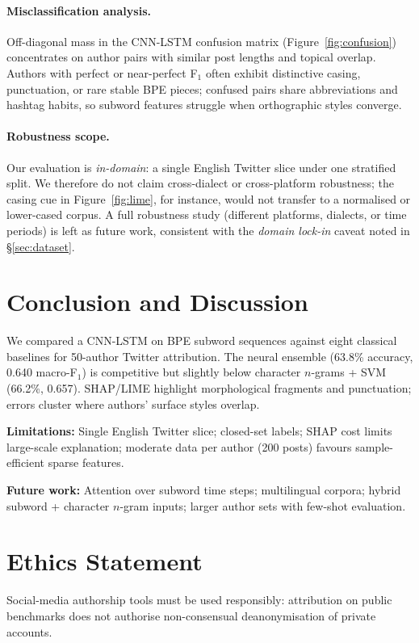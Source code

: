 \documentclass[11pt]{article}
\begin{document}
\paragraph{Misclassification analysis.}
Off-diagonal mass in the CNN-LSTM confusion matrix (Figure~\ref{fig:confusion}) concentrates on author pairs with similar post lengths and topical overlap.
Authors with perfect or near-perfect F$_1$ often exhibit distinctive casing, punctuation, or rare stable BPE pieces; confused pairs share abbreviations and hashtag habits, so subword features struggle when orthographic styles converge.

\paragraph{Robustness scope.}
Our evaluation is \emph{in-domain}: a single English Twitter slice under one stratified split.
We therefore do not claim cross-dialect or cross-platform robustness; the casing cue in Figure~\ref{fig:lime}, for instance, would not transfer to a normalised or lower-cased corpus.
A full robustness study (different platforms, dialects, or time periods) is left as future work, consistent with the \emph{domain lock-in} caveat noted in \S\ref{sec:dataset}.

\section{Conclusion and Discussion}
\label{sec:conclusion}

We compared a CNN-LSTM on BPE subword sequences against eight classical baselines for 50-author Twitter attribution.
The neural ensemble (63.8\% accuracy, 0.640 macro-F$_1$) is competitive but slightly below character $n$-grams + SVM (66.2\%, 0.657).
SHAP/LIME highlight morphological fragments and punctuation; errors cluster where authors' surface styles overlap.

\textbf{Limitations:} Single English Twitter slice; closed-set labels; SHAP cost limits large-scale explanation; moderate data per author (200 posts) favours sample-efficient sparse features.

\textbf{Future work:} Attention over subword time steps; multilingual corpora; hybrid subword + character $n$-gram inputs; larger author sets with few-shot evaluation.

\section*{Ethics Statement}

Social-media authorship tools must be used responsibly: attribution on public benchmarks does not authorise non-consensual deanonymisation of private accounts.

\FloatBarrier

\end{document}
